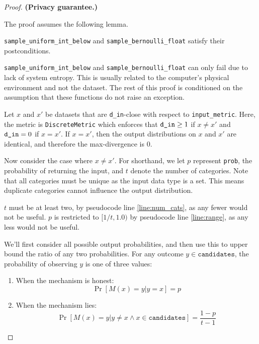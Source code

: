 \documentclass{article}
\begin{document}
\begin{proof} 
\textbf{(Privacy guarantee.)} 
    
\begin{tcolorbox}
    The proof assumes the following lemma.
    \begin{lemma}
        \texttt{sample\_uniform\_int\_below} and \texttt{sample\_bernoulli\_float} satisfy their postconditions.
    \end{lemma}
\end{tcolorbox}

\texttt{sample\_uniform\_int\_below} and \texttt{sample\_bernoulli\_float} can only fail due to lack of system entropy. 
This is usually related to the computer's physical environment and not the dataset. 
The rest of this proof is conditioned on the assumption that these functions do not raise an exception. 

Let $x$ and $x'$ be datasets that are \texttt{d\_in}-close with respect to \texttt{input\_metric}.
Here, the metric is \texttt{DiscreteMetric} which enforces that $\texttt{d\_in} \geq 1$ if $x \ne x'$ and $\texttt{d\_in} = 0$ if $x = x'$. 
If $x = x'$, then the output distributions on $x$ and $x'$ are identical, and therefore the max-divergence is 0.

Now consider the case where $x \ne x'$. 
For shorthand, we let $p$ represent \texttt{prob}, the probability of returning the input,
and $t$ denote the number of categories.
Note that all categories must be unique as the input data type is a set.
This means duplicate categories cannot influence the output distribution.

$t$ must be at least two, by pseudocode line \ref{line:num_cats}, as any fewer would not be useful.
$p$ is restricted to $[1/t, 1.0)$ by pseudocode line \ref{line:range}, as any less would not be useful.

We'll first consider all possible output probabilities, 
and then use this to upper bound the ratio of any two probabilities.
For any outcome $y \in \texttt{candidates}$, 
the probability of observing $y$ is one of three values:

\begin{enumerate}
    \item When the mechanism is honest: 
    \[
        \Pr[M(x) = y | y = x] = p
    \]

    \item When the mechanism lies: 
    \[
        \Pr[M(x) = y | y \ne x \wedge x \in \texttt{candidates}] = \frac{1 - p}{t - 1}
    \]


\end{enumerate}
\end{proof}
\end{document}

